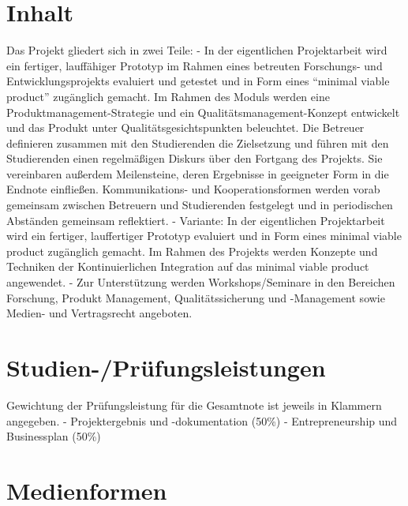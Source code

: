 \section*{Inhalt\label{/mi-2017/modulbeschreibungen-master/MA_Modul_Projekt_Verwertung}}\label{inhaltpathlabelmi-2017modulbeschreibungen-mastermaux5fmodulux5fprojektux5fverwertung}

Das Projekt gliedert sich in zwei Teile: - In der eigentlichen
Projektarbeit wird ein fertiger, lauffähiger Prototyp im Rahmen eines
betreuten Forschungs- und Entwicklungsprojekts evaluiert und getestet
und in Form eines ``minimal viable product'' zugänglich gemacht. Im
Rahmen des Moduls werden eine Produktmanagement-Strategie und ein
Qualitätsmanagement-Konzept entwickelt und das Produkt unter
Qualitätsgesichtspunkten beleuchtet. Die Betreuer definieren zusammen
mit den Studierenden die Zielsetzung und führen mit den Studierenden
einen regelmäßigen Diskurs über den Fortgang des Projekts. Sie
vereinbaren außerdem Meilensteine, deren Ergebnisse in geeigneter Form
in die Endnote einfließen. Kommunikations- und Kooperationsformen werden
vorab gemeinsam zwischen Betreuern und Studierenden festgelegt und in
periodischen Abständen gemeinsam reflektiert. - Variante: In der
eigentlichen Projektarbeit wird ein fertiger, lauffertiger Prototyp
evaluiert und in Form eines minimal viable product zugänglich gemacht.
Im Rahmen des Projekts werden Konzepte und Techniken der
Kontinuierlichen Integration auf das minimal viable product angewendet.
- Zur Unterstützung werden Workshops/Seminare in den Bereichen
Forschung, Produkt Management, Qualitätssicherung und -Management sowie
Medien- und Vertragsrecht angeboten.

\section*{Studien-/Prüfungsleistungen\label{/mi-2017/modulbeschreibungen-master/MA_Modul_Projekt_Verwertung}}\label{studien-pruxfcfungsleistungenpathlabelmi-2017modulbeschreibungen-mastermaux5fmodulux5fprojektux5fverwertung}

Gewichtung der Prüfungsleistung für die Gesamtnote ist jeweils in
Klammern angegeben. - Projektergebnis und -dokumentation (50\%) -
Entrepreneurship und Businessplan (50\%)

\section*{Medienformen\label{/mi-2017/modulbeschreibungen-master/MA_Modul_Projekt_Verwertung}}\label{medienformenpathlabelmi-2017modulbeschreibungen-mastermaux5fmodulux5fprojektux5fverwertung}

